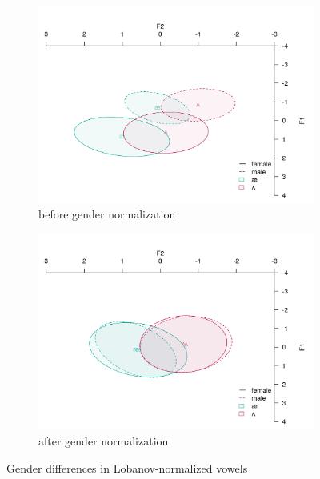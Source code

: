 \documentclass[12 pt]{article}
\begin{document}
\begin{figure} \label{figure_gender_normalization}
	\centering
	\begin{subfigure}[t]{0.5\textwidth}
		\centering
		\includegraphics[width=\textwidth]{gender_before} 
		\caption{before gender normalization} \label{gender_before}
	\end{subfigure}
	\hfill
	\begin{subfigure}[t]{0.5\textwidth}
		\centering
		\includegraphics[width=\textwidth]{gender_after} 
		\caption{after gender normalization} \label{gender_after}
	\end{subfigure}
\caption{Gender differences in Lobanov-normalized vowels}
\end{figure}

\newpage
\end{document}
